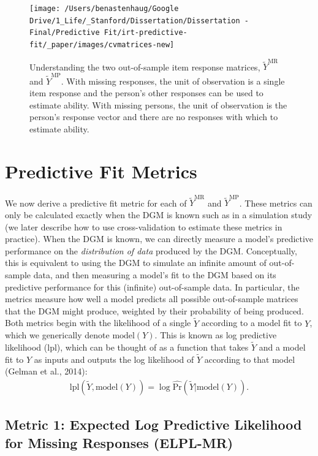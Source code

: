 \documentclass[
  english,
  man,floatsintext]{apa7}
\begin{document}
\begin{figure}

{\centering \texttt{[image: /Users/benastenhaug/Google Drive/1\_Life/\_Stanford/Dissertation/Dissertation - Final/Predictive Fit/irt-predictive-fit/\_paper/images/cvmatrices-new]} 

}

\caption{Understanding the two out-of-sample item response matrices, $\tilde Y^{\text{MR}}$ and $\tilde Y^{\text{MP}}$. With missing responses, the unit of observation is a single item response and the person's other responses can be used to estimate ability. With missing persons, the unit of observation is the person's response vector and there are no responses with which to estimate ability.}\label{fig:elpl}
\end{figure}

\hypertarget{pfm}{%
\section{Predictive Fit Metrics}\label{pfm}}

We now derive a predictive fit metric for each of \(\tilde Y^{\text{MR}}\) and \(\tilde Y^{\text{MP}}\). These metrics can only be calculated exactly when the DGM is known such as in a simulation study (we later describe how to use cross-validation to estimate these metrics in practice). When the DGM is known, we can directly measure a model's predictive performance on the \emph{distribution of data} produced by the DGM. Conceptually, this is equivalent to using the DGM to simulate an infinite amount of out-of-sample data, and then measuring a model's fit to the DGM based on its predictive performance for this (infinite) out-of-sample data. In particular, the metrics measure how well a model predicts all possible out-of-sample matrices that the DGM might produce, weighted by their probability of being produced. Both metrics begin with the likelihood of a single \(\tilde{Y}\) according to a model fit to \(Y\), which we generically denote \(\text{model}(Y)\). This is known as log predictive likelihood (lpl), which can be thought of as a function that takes \(\tilde Y\) and a model fit to \(Y\) as inputs and outputs the log likelihood of \(\tilde Y\) according to that model (Gelman et al., 2014):
\begin{align}
\text{lpl}(\tilde{Y}, \text{model}(Y))  = \log \hat{\text{Pr}}(\tilde{Y} | \text{model}(Y)).
\end{align}

\hypertarget{metric-1-expected-log-predictive-likelihood-for-missing-responses-elpl-mr}{%
\subsection{Metric 1: Expected Log Predictive Likelihood for Missing Responses (ELPL-MR)}\label{metric-1-expected-log-predictive-likelihood-for-missing-responses-elpl-mr}}
\end{document}
